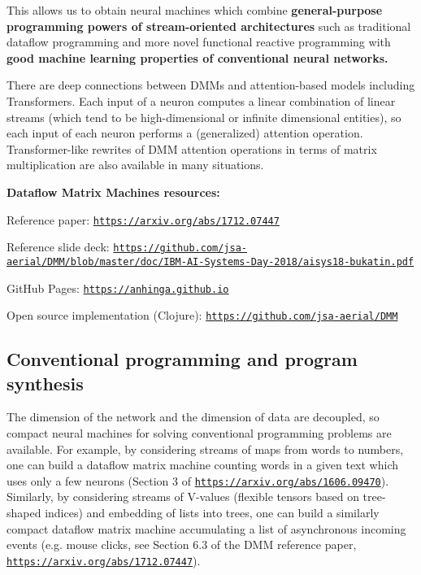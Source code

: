 \documentclass{article}
\begin{document}
This allows us to obtain 
neural machines which combine {\bf general-purpose programming powers of stream-oriented
architectures} such as traditional dataflow programming and
more novel functional reactive programming with {\bf good machine learning
properties of conventional neural networks.}

There are deep connections between DMMs and attention-based models including Transformers.
Each input of a neuron computes a linear combination of linear streams (which tend to be high-dimensional
or infinite dimensional entities), so each input of each neuron performs a (generalized) attention operation.
Transformer-like rewrites of DMM attention operations in terms of matrix multiplication are also available in many situations.

\vspace{0.1in}
\noindent
{\bf Dataflow Matrix Machines resources:}

Reference paper: \href{https://arxiv.org/abs/1712.07447}{\tt https://arxiv.org/abs/1712.07447}

Reference slide deck: \href{https://github.com/jsa-aerial/DMM/blob/master/doc/IBM-AI-Systems-Day-2018/aisys18-bukatin.pdf}{\scriptsize\tt https://github.com/jsa-aerial/DMM/blob/master/doc/IBM-AI-Systems-Day-2018/aisys18-bukatin.pdf}

GitHub Pages: \href{https://anhinga.github.io/}{\tt https://anhinga.github.io}

Open source implementation (Clojure): \href{https://github.com/jsa-aerial/DMM}{\tt https://github.com/jsa-aerial/DMM}

\subsection{Conventional programming and program synthesis} The dimension of the network and the dimension
of data are decoupled, so compact neural machines for solving conventional programming problems are available.
For example, by considering streams of maps from words to numbers, one can build a dataflow matrix machine
counting words in a given text which uses only a few neurons 
(Section 3 of \href{https://arxiv.org/abs/1606.09470}{\tt https://arxiv.org/abs/1606.09470}).
Similarly, by considering streams of V-values  (flexible tensors based on tree-shaped indices) and embedding
of lists into trees, one can build a similarly compact dataflow matrix machine
accumulating a list of asynchronous incoming events
(e.g. mouse clicks, see Section 6.3 of the DMM reference paper, \href{https://arxiv.org/abs/1712.07447}{\tt https://arxiv.org/abs/1712.07447}). 
\end{document}
